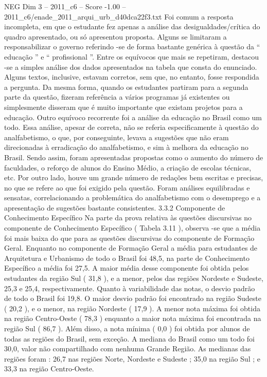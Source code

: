 \begin{textsample}{NEG Dim 3 – 2011\_c6 – Score -1.00 – 2011\_c6/enade\_2011\_arqui\_urb\_d40dca22f3.txt}
Foi comum a resposta incompleta, em que o estudante fez apenas a análise das desigualdades/crítica do quadro apresentado, ou só apresentou proposta.
Alguns se limitaram a responsabilizar o governo referindo -se de forma bastante genérica à questão da “ educação ” e “ profissional ”.
Entre os equívocos que mais se repetiram, destacou -se a simples análise dos dados apresentados na tabela que consta do enunciado.
Alguns textos, inclusive, estavam corretos, sem que, no entanto, fosse respondida a pergunta.
Da mesma forma, quando os estudantes partiram para a segunda parte da questão, fizeram referência a vários programas já existentes ou simplesmente disseram que é muito importante que existam projetos para a educação.
Outro equívoco recorrente foi a análise da educação no Brasil como um todo.
Essa análise, apesar de correta, não se referia especificamente à questão do analfabetismo, o que, por conseguinte, levava a sugestões que não eram direcionadas à erradicação do analfabetismo, e sim à melhora da educação no Brasil.
Sendo assim, foram apresentadas propostas como o aumento do número de faculdades, o reforço de alunos do Ensino Médio, a criação de escolas técnicas, etc.
Por outro lado, houve um grande número de redações bem escritas e precisas, no que se refere ao que foi exigido pela questão.
Foram análises equilibradas e sensatas, correlacionando a problemática do analfabetismo com o desemprego e a apresentação de sugestões bastante consistentes. 3.3.2 Componente de Conhecimento Específico Na parte da prova relativa às questões discursivas no componente de Conhecimento Específico ( Tabela 3.11 ), observa -se que a média foi mais baixa do que para as questões discursivas do componente de Formação Geral.
Enquanto no componente de Formação Geral a média para estudantes de Arquitetura e Urbanismo de todo o Brasil foi 48,5, na parte de Conhecimento Específico a média foi 27,5.
A maior média desse componente foi obtida pelos estudantes da região Sul ( 31,8 ), e a menor, pelos das regiões Nordeste e Sudeste, 25,3 e 25,4, respectivamente.
Quanto à variabilidade das notas, o desvio padrão de todo o Brasil foi 19,8.
O maior desvio padrão foi encontrado na região Sudeste ( 20,2 ), e o menor, na região Nordeste ( 17,9 ).
A menor nota máxima foi obtida na região Centro-Oeste ( 78,3 ) enquanto a maior nota máxima foi encontrada na região Sul ( 86,7 ).
Além disso, a nota mínima ( 0,0 ) foi obtida por alunos de todas as regiões do Brasil, sem exceção.
A mediana do Brasil como um todo foi 30,0, valor não compartilhado com nenhuma Grande Região.
As medianas das regiões foram : 26,7 nas regiões Norte, Nordeste e Sudeste ; 35,0 na região Sul ; e 33,3 na região Centro-Oeste.

\end{textsample}
